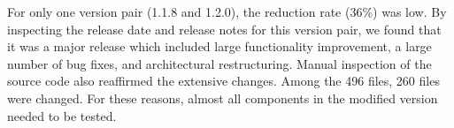 For only one version pair (1.1.8 and 1.2.0), the reduction rate (36\%) 
was low. By inspecting the release date and release notes 
for this version pair, we found that it was a major release
which included large functionality improvement, a large number of bug fixes, 
and architectural restructuring. Manual inspection of the source code also 
reaffirmed the extensive changes. Among the 496 files, 260 files were changed.
For these reasons, almost all components in the modified version needed 
to be tested.

